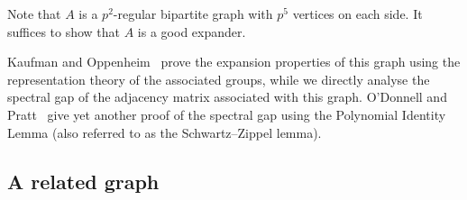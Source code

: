 \documentclass{toc}
\begin{document}
Note that $A$ is %
a  %
$p^2$-regular bipartite graph with  $p^5$ vertices on each side.
It suffices to show that $A$ is a good expander. 


Kaufman and Oppenheim~\cite{KaufmanO2018} prove the expansion
properties of this graph using
the  %
representation theory of the associated
groups, while we directly analyse the spectral gap of the adjacency
matrix associated with this graph. O'Donnell and Pratt~\cite[Case 2 in
the Proof of Theorem 3.23]{ODonnellP2022} give yet another proof of the 
spectral gap using the Polynomial Identity Lemma (also referred to as 
the Schwartz--Zippel lemma). 


\subsection{A related graph}
\end{document}
